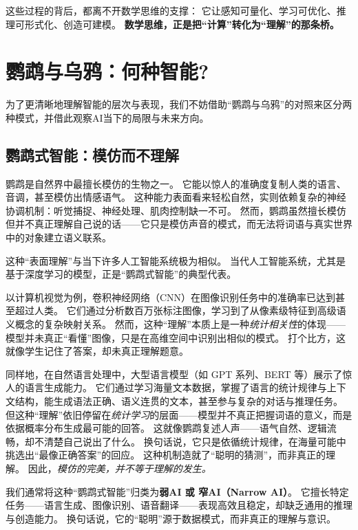 这些过程的背后，都离不开数学思维的支撑：  
它让感知可量化、学习可优化、推理可形式化、创造可建模。  
\textbf{数学思维，正是把“计算”转化为“理解”的那条桥。}

\section{鹦鹉与乌鸦：何种智能?}

为了更清晰地理解智能的层次与表现，我们不妨借助“鹦鹉与乌鸦”的对照来区分两种模式，并借此观察AI当下的局限与未来方向。


\subsection{鹦鹉式智能：模仿而不理解}

鹦鹉是自然界中最擅长模仿的生物之一。
它能以惊人的准确度复制人类的语言、音调，甚至模仿出情感语气。 %
这种能力表面看来轻松自然，实则依赖复杂的神经协调机制：听觉捕捉、神经处理、肌肉控制缺一不可。
然而，鹦鹉虽然擅长模仿但并不真正理解自己说的话——它只是模仿声音的模式，而无法将词语与真实世界中的对象建立语义联系。

这种“表面理解”与当下许多人工智能系统极为相似。  
当代人工智能系统，尤其是基于深度学习的模型，正是“鹦鹉式智能”的典型代表。

以计算机视觉为例，卷积神经网络（CNN）在图像识别任务中的准确率已达到甚至超过人类。
它们通过分析数百万张标注图像，学习到了从像素级特征到高级语义概念的复杂映射关系。
然而，这种“理解”本质上是一种\emph{统计相关性}的体现——模型并未真正“看懂”图像，只是在高维空间中识别出相似的模式。 打个比方，这就像学生记住了答案，却未真正理解题意。

同样地，在自然语言处理中，大型语言模型（如 GPT 系列、BERT 等）展示了惊人的语言生成能力。
它们通过学习海量文本数据，掌握了语言的统计规律与上下文结构，能生成语法正确、语义连贯的文本，甚至参与复杂的对话与推理任务。
但这种“理解”依旧停留在\emph{统计学习}的层面——模型并不真正把握词语的意义，而是依据概率分布生成最可能的回答。  
这就像鹦鹉复述人声——语气自然、逻辑流畅，却不清楚自己说出了什么。
换句话说，它只是依循统计规律，在海量可能中挑选出“最像正确答案”的回应。  
这种机制造就了“聪明的猜测”，而非真正的理解。  
因此，\emph{模仿的完美，并不等于理解的发生。}


我们通常将这种“鹦鹉式智能”归类为\textbf{弱AI 或 窄AI（Narrow AI）}。
它擅长特定任务——语言生成、图像识别、语音翻译——表现高效且稳定，却缺乏通用的推理与创造能力。
换句话说，它的“聪明”源于数据模式，而非真正的理解与意识。

